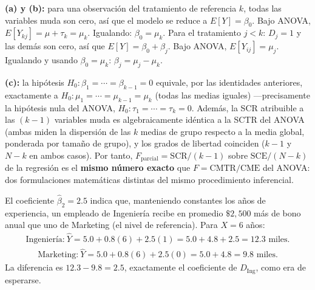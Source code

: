 \begin{solproblema}[prob:a61b69d]
	\textbf{(a) y (b):} para una observación del tratamiento de referencia $k$, todas las variables muda son cero, así que el modelo se reduce a $E[Y]=\beta_0$. Bajo ANOVA, $E[Y_{kj}]=\mu+\tau_k=\mu_k$. Igualando: $\beta_0=\mu_k$. Para el tratamiento $j<k$: $D_j=1$ y las demás son cero, así que $E[Y]=\beta_0+\beta_j$. Bajo ANOVA, $E[Y_{ij}]=\mu_j$. Igualando y usando $\beta_0=\mu_k$: $\beta_j=\mu_j-\mu_k$.

	\textbf{(c):} la hipótesis $H_0:\beta_1=\cdots=\beta_{k-1}=0$ equivale, por las identidades anteriores, exactamente a $H_0:\mu_1=\cdots=\mu_{k-1}=\mu_k$ (todas las medias iguales) —precisamente la hipótesis nula del ANOVA, $H_0:\tau_1=\cdots=\tau_k=0$. Además, la SCR atribuible a las $(k-1)$ variables muda es algebraicamente idéntica a la SCTR del ANOVA (ambas miden la dispersión de las $k$ medias de grupo respecto a la media global, ponderada por tamaño de grupo), y los grados de libertad coinciden ($k-1$ y $N-k$ en ambos casos). Por tanto, $F_{\text{parcial}}=\text{SCR}/(k-1)$ sobre $\text{SCE}/(N-k)$ de la regresión es el \textbf{mismo número exacto} que $F=\text{CMTR}/\text{CME}$ del ANOVA: dos formulaciones matemáticas distintas del mismo procedimiento inferencial.
\end{solproblema}

\begin{solproblema}
	El coeficiente $\hat\beta_2=2.5$ indica que, manteniendo constantes los años de experiencia, un empleado de Ingeniería recibe en promedio $\$2{,}500$ más de bono anual que uno de Marketing (el nivel de referencia). Para $X=6$ años:
	\begin{align}
		\text{Ingeniería:}\ \hat Y = 5.0+0.8(6)+2.5(1) = 5.0+4.8+2.5 = 12.3 \text{ miles.}
	\end{align}
	\begin{align}
		\text{Marketing:}\ \hat Y = 5.0+0.8(6)+2.5(0) = 5.0+4.8 = 9.8 \text{ miles.}
	\end{align}
	La diferencia es $12.3-9.8=2.5$, exactamente el coeficiente de $D_{\text{Ing}}$, como era de esperarse.
\end{solproblema}
